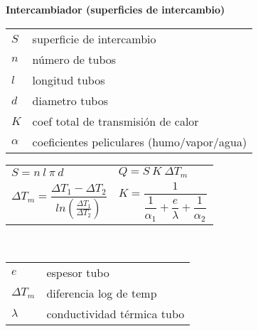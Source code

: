 \documentclass[11pt,a4paper]{article}
\begin{document}
	\begin{cajita}
			\begin{center}
				\textbf{Intercambiador (superficies de intercambio)}
			\end{center}
	
			\begin{multicols}{2}
				\renewcommand{\arraystretch}{1}
				\begin{tabular}{@{}p{1cm}@{}@{}p{7cm}@{}}
					$S$ & superficie de intercambio\\
					$n$ & número de tubos\\
					$l$ & longitud tubos\\
					$d$& diametro tubos\\
					$K$ & coef total de transmisión de calor\\
					$\alpha$ & coeficientes peliculares \break (humo/vapor/agua)\\
				\end{tabular}
				
				\renewcommand{\arraystretch}{1.5}
				\begin{tabular}{l l}
					$S=n~l~\pi~d$ &	$Q=S~K~\Delta T_m$\\[0.2cm]
					$\Delta T_m = \dfrac {\Delta T_1 - \Delta T_2}{ln\left(\frac{\Delta T_1}{\Delta T_2}\right)}$ & $K=\dfrac{1}{\dfrac{1}{\alpha_1}+\dfrac{e}{\lambda}+\dfrac{1}{\alpha_2}}$\\
				\end{tabular}\\
				\renewcommand{\arraystretch}{1}
				\begin{tabular}{@{}p{1cm}@{}@{}p{7cm}@{}}
					$e$& espesor tubo\\
					$\Delta T_m$ & diferencia log de temp\\
					$\lambda$ & conductividad térmica tubo\\
	
				\end{tabular}
			\end{multicols}
		\end{cajita}
\end{document}
